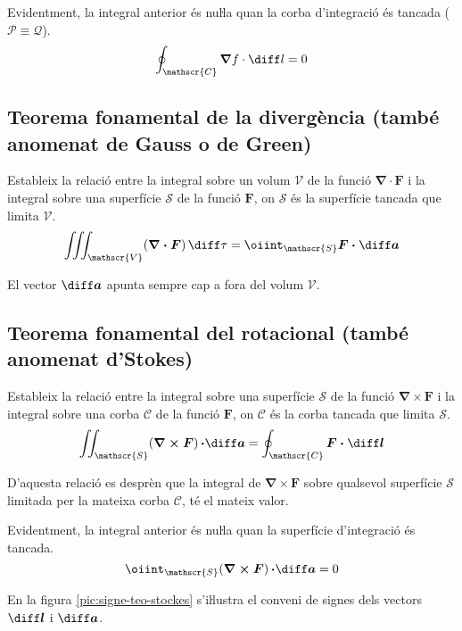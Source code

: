 \documentclass[catalan,a4paper,twoside,11pt]{article}
\begin{document}
Evidentment, la integral anterior és nuŀla quan la corba d'integració és tancada ($\mathscr{P} \equiv \mathscr{Q}$).
\begin{equation}
    \oint_\mathscr{C} \boldsymbol{\nabla}f \cdot \diff l = 0
\end{equation}

\subsection{Teorema fonamental de la divergència (també anomenat de Gauss o de Green)}
Estableix la relació entre la integral sobre un volum $\mathscr{V}$ de la funció $\boldsymbol{\nabla\cdot F}$ i la integral sobre una superfície $\mathscr{S}$ de la funció $\boldsymbol{F}$, on $\mathscr{S}$ és la superfície tancada que limita $\mathscr{V}$.
\begin{equation}
    \iiint_\mathscr{V}(\boldsymbol{\nabla\cdot F})\,\diff \tau = \oiint_\mathscr{S}\boldsymbol{F\cdot\diff a}
\end{equation}

El vector $\boldsymbol{\diff a}$ apunta sempre cap a fora del volum $\mathscr{V}$.

\subsection{Teorema fonamental del rotacional (també anomenat d'Stokes)}
Estableix la relació entre la integral sobre una superfície $\mathscr{S}$ de la funció $\boldsymbol{\nabla\times F}$ i la integral sobre una corba $\mathscr{C}$ de la funció $\boldsymbol{F}$, on $\mathscr{C}$ és la corba tancada que limita $\mathscr{S}$.
\begin{equation}
    \iint_\mathscr{S}(\boldsymbol{\nabla\times F})\boldsymbol{\,\cdot\diff a} =
    \oint_\mathscr{C}\boldsymbol{F\cdot\diff l}
\end{equation}

D'aquesta relació es desprèn que la integral de $\boldsymbol{\nabla\times F}$ sobre qualsevol superfície $\mathscr{S}$ limitada per la mateixa corba $\mathscr{C}$, té el mateix valor.

Evidentment, la integral anterior és nuŀla quan la superfície d'integració és tancada.
\begin{equation}
    \oiint_\mathscr{S}(\boldsymbol{\nabla\times F})\boldsymbol{\,\cdot\diff a} = 0
\end{equation}

En la figura \vref{pic:signe-teo-stockes} s'iŀlustra el conveni de
signes dels vectors $\boldsymbol{\diff l}$ i $\boldsymbol{\diff a}$.
\end{document}

